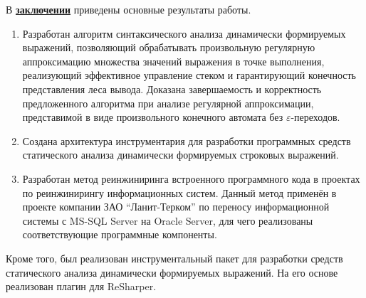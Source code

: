 В \underline{\textbf{заключении}} приведены основные результаты работы.
\begin{enumerate}
    \item Разработан алгоритм синтаксического анализа динамически формируемых выражений, позволяющий обрабатывать произвольную регулярную аппроксимацию множества значений выражения в точке выполнения, реализующий 
    эффективное управление стеком и гарантирующий конечность представления леса вывода. Доказана завершаемость и корректность предложенного алгоритма при анализе регулярной аппроксимации, представимой в виде произвольного конечного автомата без $\varepsilon$-переходов.
    \item Создана архитектура инструментария для разработки программных средств статического анализа динамически формируемых строковых выражений.
    \item Разработан метод реинжиниринга встроенного программного кода в проектах по реинжинирингу информационных систем. Данный метод применён в проекте компании ЗАО ``Ланит-Терком'' по переносу информационной системы с MS-SQL Server на Oracle Server, для чего реализованы соответствующие программные компоненты.
\end{enumerate}

Кроме того, был реализован инструментальный пакет для разработки средств статического анализа динамически формируемых выражений. На его основе реализован плагин для ReSharper. 

\newpage
\renewcommand{\refname}{\Large Публикации автора по теме диссертации}

